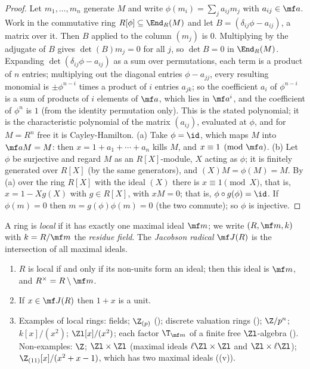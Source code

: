 \begin{proof}
Let $m_1,\dots,m_n$ generate $M$ and write $\phi(m_i)=\sum_ja_{ij}m_j$ with $a_{ij}\in\mf a$. Work in the commutative ring $R[\phi]\subseteq\End_R(M)$
and let $B=(\delta_{ij}\phi-a_{ij})$, a matrix over it. Then $B$ applied to the column $(m_j)$ is $0$. Multiplying by the adjugate of
$B$ gives $\det(B)m_j=0$ for all $j$, so $\det B=0$ in $\End_R(M)$. Expanding $\det(\delta_{ij}\phi-a_{ij})$ as a sum over permutations,
each term is a product of $n$ entries; multiplying out the diagonal entries $\phi-a_{jj}$, every resulting monomial is $\pm\phi^{n-i}$ times
a product of $i$ entries $a_{jk}$; so the coefficient $a_i$ of $\phi^{n-i}$ is a sum of products of $i$ elements of $\mf a$, which lies in $\mf a^i$, and the
coefficient of $\phi^n$ is $1$ (from the identity permutation only). This is the stated polynomial; it is the characteristic
polynomial of the matrix $(a_{ij})$, evaluated at $\phi$, and for $M=R^n$ free it is Cayley-Hamilton.
(a) Take $\phi=\id$, which maps $M$ into $\mf aM=M$: then $x=1+a_1+\cdots+a_n$ kills $M$, and $x\equiv1\pmod{\mf a}$. (b) Let $\phi$ be
surjective and regard $M$ as an $R[X]$-module, $X$ acting as $\phi$; it is finitely generated over $R[X]$ (by the same generators), and
$(X)M=\phi(M)=M$. By (a) over the ring $R[X]$ with the ideal $(X)$ there is $x\equiv1\pmod X$, that is, $x=1-Xg(X)$ with $g\in R[X]$, with
$xM=0$; that is, $\phi\circ g(\phi)=\id$. If $\phi(m)=0$ then $m=g(\phi)\phi(m)=0$ (the two commute); so $\phi$ is injective.
\end{proof}

\begin{definition}\label{def:modules:local-ring}
A ring is \emph{local} if it has exactly one maximal ideal $\mf m$; we write $(R,\mf m,k)$ with $k=R/\mf m$ the \emph{residue field}.
The \emph{Jacobson radical} $\mf J(R)$ is the intersection of all maximal ideals.
\end{definition}

\begin{proposition}\label{prop:modules:local-ring}
\begin{enumerate}[label=(\roman*)]
\item $R$ is local if and only if its non-units form an ideal; then this ideal is $\mf m$, and $R^\times=R\setminus\mf m$.
\item If $x\in\mf J(R)$ then $1+x$ is a unit.
\item Examples of local rings: fields; $\Z_{(p)}$ (); discrete valuation rings (); $\Z/p^n$;
$k[x]/(x^2)$; $\Zl[x]/(x^2)$; each factor $\T_{\mf m}$ of a finite free $\Zl$-algebra ().
Non-examples: $\Z$; $\Zl\times\Zl$ (maximal ideals $\ell\Zl\times\Zl$ and $\Zl\times\ell\Zl$); $\Z_{(11)}[x]/(x^2+x-1)$, which has two
maximal ideals ((v)).
\end{enumerate}
\end{proposition}

